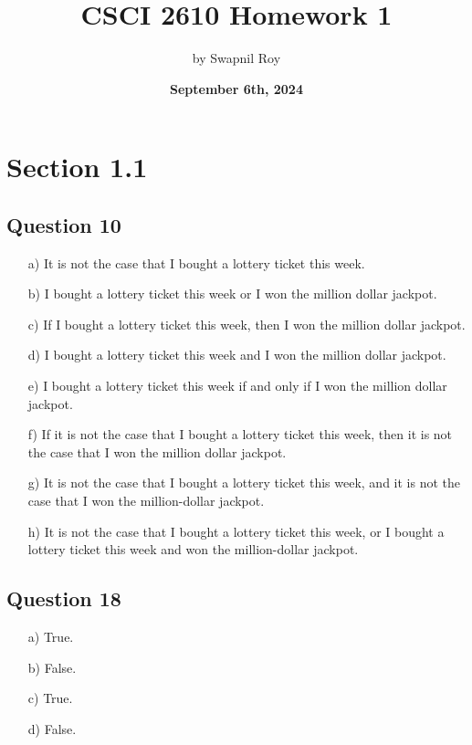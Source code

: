 \documentclass{article}
\title{\textbf{CSCI 2610 Homework 1}}
\date{\textbf{September 6th, 2024}}
\author{by Swapnil Roy}
\begin{document}
\maketitle
\raggedright

\section*{Section 1.1}

\subsection*{Question 10}
\begin{enumerate}
    \item[a)] It is not the case that I bought a lottery ticket this week.
    \item[b)] I bought a lottery ticket this week or I won the million dollar jackpot.
    \item[c)] If I bought a lottery ticket this week, then I won the million dollar jackpot.
    \item[d)] I bought a lottery ticket this week and I won the million dollar jackpot.
    \item[e)] I bought a lottery ticket this week if and only if I won the million dollar jackpot.
    \item[f)] If it is not the case that I bought a lottery ticket this week, then it is not the case that I won the million dollar jackpot.
    \item[g)] It is not the case that I bought a lottery ticket this week, and it is not the case that I won the million-dollar jackpot.
    \item[h)] It is not the case that I bought a lottery ticket this week, or I bought a lottery ticket this week and won the million-dollar jackpot.
\end{enumerate}

\subsection*{Question 18}
\begin{enumerate}
    \item[a)] True.
    \item[b)] False.
    \item[c)] True.
    \item[d)] False.
\end{enumerate}
\end{document}
